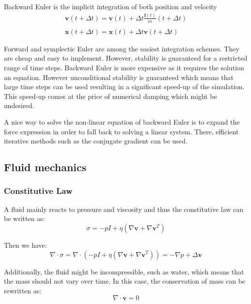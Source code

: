 Backward Euler is the implicit integration of both position and velocity
\begin{equation}
\label{eq:backwardEuler}
\begin{array}{ll}
\displaystyle \mathbf{v}(t+\Delta t) = \mathbf{v}(t) + \Delta t \frac{\mathbf{f}(t)}{m}(t+\Delta t) \\ \\
\displaystyle \mathbf{x}(t+\Delta t) = \mathbf{x}(t) + \Delta t \mathbf{v}(t+\Delta t)
\end{array}
\end{equation}

Forward and symplectic Euler are among the easiest integration schemes. 
They are cheap and easy to implement. 
However, stability is guaranteed for a restricted range of time steps. 
Backward Euler is more expensive as it requires the solution an equation. 
However unconditional stability is guaranteed which means that large time steps can be used resulting in a significant speed-up of the simulation. This speed-up comes at the price of numerical damping which might be undesired.

A nice way to solve the non-linear equation of backward Euler is to expand the force expression in order to fall back to solving a linear system. There, efficient iterative methods such as the conjugate gradient can be used.

\subsection{Fluid mechanics}
\label{subsec:fluidMechanics}

\subsubsection{Constitutive Law}

A fluid mainly reacts to pressure and viscosity and thus the constitutive law can be written as:
\begin{equation}
\label{eq:fluidConstitutiveLaw}
\sigma = -pI + \eta \left( \nabla \mathbf{v} + \nabla \mathbf{v}^{T} \right)
\end{equation}

Then we have:
\begin{equation}
\nabla \cdot \sigma = \nabla \cdot \left( -pI + \eta \left( \nabla \mathbf{v} + \nabla \mathbf{v}^{T} \right) \right) = -\nabla p + \Delta \mathbf{v}
\end{equation}

Additionally, the fluid might be incompressible, such as water, which means that the mass should not vary over time. In this case, the conservation of mass can be rewritten as:
\begin{equation}
\nabla \cdot \mathbf{v} = 0
\end{equation}

